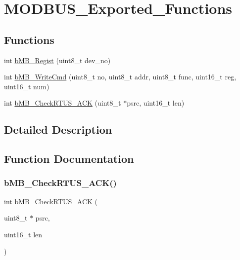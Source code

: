 \hypertarget{group___m_o_d_b_u_s___exported___functions}{}\section{M\+O\+D\+B\+U\+S\+\_\+\+Exported\+\_\+\+Functions}
\label{group___m_o_d_b_u_s___exported___functions}
\subsection*{Functions}
\begin{DoxyCompactItemize}
\item 
int \mbox{\hyperlink{group___m_o_d_b_u_s___exported___functions_ga75fd562c121d4610608a1ab4053408da}{b\+M\+B\+\_\+\+Regist}} (uint8\+\_\+t dev\+\_\+no)
\item 
int \mbox{\hyperlink{group___m_o_d_b_u_s___exported___functions_ga38a5181debf88b4ac37908e89ff087be}{b\+M\+B\+\_\+\+Write\+Cmd}} (uint8\+\_\+t no, uint8\+\_\+t addr, uint8\+\_\+t func, uint16\+\_\+t reg, uint16\+\_\+t num)
\item 
int \mbox{\hyperlink{group___m_o_d_b_u_s___exported___functions_ga9e0e2e9b8286a5db0ff6ef63885b8b2e}{b\+M\+B\+\_\+\+Check\+R\+T\+U\+S\+\_\+\+A\+CK}} (uint8\+\_\+t $\ast$psrc, uint16\+\_\+t len)
\end{DoxyCompactItemize}


\subsection{Detailed Description}


\subsection{Function Documentation}
\mbox{\label{group___m_o_d_b_u_s___exported___functions_ga9e0e2e9b8286a5db0ff6ef63885b8b2e}} 
\subsubsection{\texorpdfstring{b\+M\+B\+\_\+\+Check\+R\+T\+U\+S\+\_\+\+A\+C\+K()}{bMB\_CheckRTUS\_ACK()}}
{\footnotesize\ttfamily int b\+M\+B\+\_\+\+Check\+R\+T\+U\+S\+\_\+\+A\+CK (\begin{DoxyParamCaption}\item[{uint8\+\_\+t $\ast$}]{psrc,  }\item[{uint16\+\_\+t}]{len }\end{DoxyParamCaption})}

